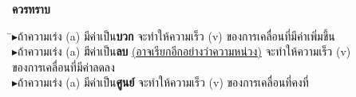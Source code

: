 \textbf{ควรทราบ}
\begin{tabbing}
\quad 	\=$\blacktriangleright $ถ้าความเร่ง (a) มีค่าเป็น\textbf{บวก}	จะทำให้ความเร็ว (v) ของการเคลื่อนที่มีค่าเพิ่มขึ้น \\
		\>$\blacktriangleright $ถ้าความเร่ง (a) \=มีค่าเป็น\textbf{ลบ}  \underline{(อาจเรียกอีกอย่างว่าความหน่วง)}  จะทำให้ความเร็ว (v) \\
		\>\>ของการเคลื่อนที่มีค่าลดลง \\
		\>$\blacktriangleright $ถ้าความเร่ง (a) มีค่าเป็น\textbf{ศูนย์}  จะทำให้ความเร็ว (v) ของการเคลื่อนที่คงที่
\end{tabbing}
